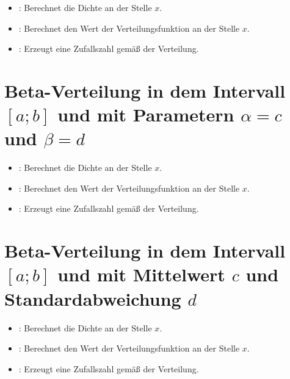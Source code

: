 \begin{itemize}

\item
{}:
Berechnet die Dichte an der Stelle $x$.

\item
{}:
Berechnet den Wert der Verteilungsfunktion an der Stelle $x$.

\item
{}:
Erzeugt eine Zufallszahl gemäß der Verteilung.

\end{itemize}



\section{Beta-Verteilung in dem Intervall \texorpdfstring{$[a;b]$}{[a;b]} und mit Parametern \texorpdfstring{$\alpha=c$}{c} und \texorpdfstring{$\beta=d$}{d}}

\begin{itemize}

\item
{}:
Berechnet die Dichte an der Stelle $x$.

\item
{}:
Berechnet den Wert der Verteilungsfunktion an der Stelle $x$.

\item
{}:
Erzeugt eine Zufallszahl gemäß der Verteilung.

\end{itemize}



\section{Beta-Verteilung in dem Intervall \texorpdfstring{$[a;b]$}{[a;b]} und mit Mittelwert \texorpdfstring{$c$}{c} und Standardabweichung \texorpdfstring{$d$}{d}}

\begin{itemize}

\item
{}:
Berechnet die Dichte an der Stelle $x$.

\item
{}:
Berechnet den Wert der Verteilungsfunktion an der Stelle $x$.

\item
{}:
Erzeugt eine Zufallszahl gemäß der Verteilung.

\end{itemize}



